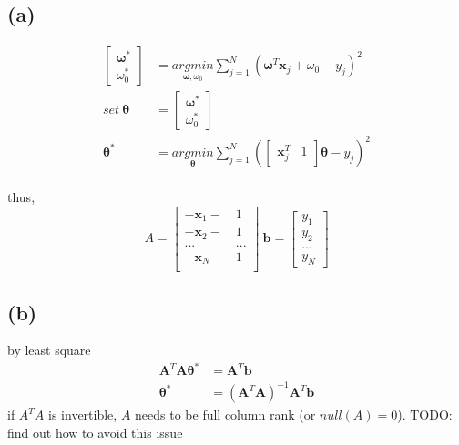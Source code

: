 \documentclass[11pt]{article}
\begin{document}
\subsection*{(a)}
\begin{equation}	\label{eq2(a)}
\begin{split}
\begin{bmatrix}\pmb{\omega}^*\\ \omega^*_0\end{bmatrix}
&=\underset{\pmb{\omega},\omega_0}{argmin}\sum_{j=1}^N(\pmb{\omega}^T\pmb{x}_j+\omega_0-y_j)^2\\
set\ \pmb{\theta}&=\begin{bmatrix}\pmb{\omega}^*\\ \omega^*_0\end{bmatrix}\\
\pmb{\theta}^*&=\underset{\pmb{\theta}}{argmin}\sum_{j=1}^N(\begin{bmatrix}\pmb{x}_j^T & 1\end{bmatrix}\pmb{\theta}-y_j)^2\\
\end{split}
\end{equation}
\begin{center}
thus,\\
$$A=\begin{bmatrix}
-\pmb{x}_1- & 1\\
-\pmb{x}_2- & 1\\
...& ...\\
-\pmb{x}_N- & 1\\
\end{bmatrix}\ 
\pmb{b}=\begin{bmatrix}
y_1\\
y_2\\
...\\
y_N
\end{bmatrix}$$
\end{center}
\subsection*{(b)}
by least square
\begin{equation}	\label{eq2(b)}
\begin{split}
\pmb{A}^T\pmb{A\theta}^*&=\pmb{A}^T\pmb{b}\\
\pmb{\theta}^*&=(\pmb{A}^T\pmb{A})^{-1}\pmb{A}^T\pmb{b}
\end{split}
\end{equation}
if $A^TA$ is invertible, $A$ needs to be full column rank (or $null(A)=0$).
TODO: find out how to avoid this issue
\end{document}
